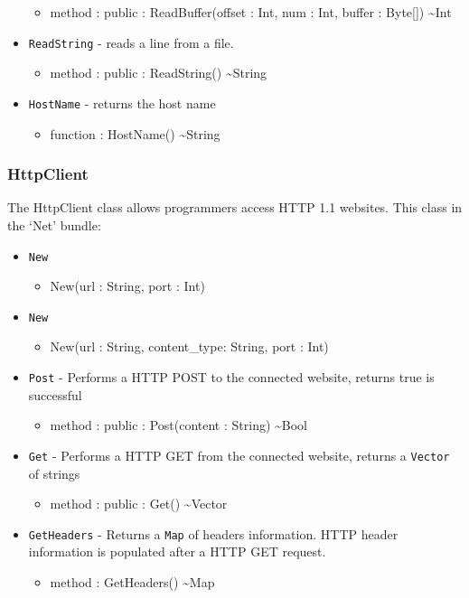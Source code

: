 \documentclass[12pt]{article}
\begin{document}
\begin{itemize}
  \begin{itemize}
  \item method : public : ReadBuffer(offset : Int, num : Int, buffer :
    Byte[]) \textasciitilde Int
  \end{itemize}
\item \texttt{ReadString} - reads a line from a file.
  \begin{itemize}
  \item method : public : ReadString() \textasciitilde String
  \end{itemize}
\item \texttt{HostName} - returns the host name
  \begin{itemize}
  \item function : HostName() \textasciitilde String
  \end{itemize}
\end{itemize}

\subsubsection{HttpClient}
The HttpClient class allows programmers access HTTP 1.1 websites.
This class in the `Net' bundle:
\begin{itemize}
\item \texttt{New}
  \begin{itemize}
  \item New(url : String, port : Int)
  \end{itemize}
\item \texttt{New}
  \begin{itemize}
  \item New(url : String, content\_type: String, port : Int)
  \end{itemize}
\item \texttt{Post} - Performs a HTTP POST to the connected website,
  returns true is successful
  \begin{itemize}
  \item method : public : Post(content : String) \textasciitilde Bool
  \end{itemize}
\item \texttt{Get} - Performs a HTTP GET from the connected website,
  returns a \texttt{Vector} of strings
  \begin{itemize}
  \item method : public : Get() \textasciitilde Vector
  \end{itemize}
\item \texttt{GetHeaders} - Returns a \texttt{Map} of headers
  information.  HTTP header information is populated after a HTTP GET
  request.
  \begin{itemize}
  \item method : GetHeaders() \textasciitilde Map
  \end{itemize}
\end{itemize}
\end{document}
